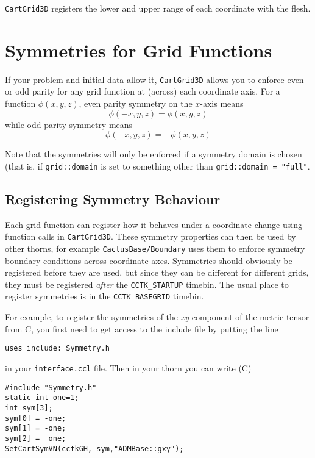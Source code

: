 \documentclass{article}
\begin{document}
\verb|CartGrid3D| registers the lower and upper range of each coordinate
with the flesh.


\section{Symmetries for Grid Functions}

If your problem and initial data allow it, \verb|CartGrid3D|
allows you to enforce even or odd parity for any grid function%
{} at (across) each coordinate axis.  For a function $\phi(x,y,z)$,
even parity symmetry on the $x$-axis means
$$
\phi(-x,y,z) = \phi(x,y,z)
$$
while odd parity symmetry means
$$
\phi(-x,y,z) = -\phi(x,y,z)
$$

Note that the symmetries will only be enforced if a symmetry domain
is chosen (that is, if \verb|grid::domain| is set to something other than
\verb|grid::domain = "full"|.


\subsection{Registering Symmetry Behaviour}

Each grid function can register how it behaves under a coordinate
change using function calls in {\tt CartGrid3D}. These symmetry
properties can then be used by other thorns, for example
{\tt CactusBase/Boundary} uses them to enforce symmetry boundary
conditions across coordinate axes. Symmetries should obviously be
registered before they are used, but since they can be different
for different grids, they must be registered {\it after} the
{\tt CCTK\_STARTUP} timebin. The usual place to register symmetries
is in the {\tt CCTK\_BASEGRID} timebin.

For example, to register the symmetries of the {\it xy} component of the
metric tensor from C, you first need to get access to the include file
by putting the line
\begin{verbatim}
uses include: Symmetry.h
\end{verbatim}
in your \verb|interface.ccl| file.  Then in your thorn you can write (C)
\begin{verbatim}
#include "Symmetry.h"
static int one=1;
int sym[3];
sym[0] = -one;
sym[1] = -one;
sym[2] =  one;
SetCartSymVN(cctkGH, sym,"ADMBase::gxy");
\end{verbatim}
\end{document}
